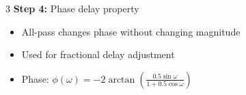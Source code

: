 \documentclass[10pt,landscape,a4paper]{article}
\begin{document}
\begin{multicols}{3}
\textbf{Step 4:} Phase delay property
\begin{itemize}
\item All-pass changes phase without changing magnitude
\item Used for fractional delay adjustment
\item Phase: $\phi(\omega) = -2\arctan(\frac{0.5\sin\omega}{1+0.5\cos\omega})$
\end{itemize}

\end{multicols}
\end{document}

